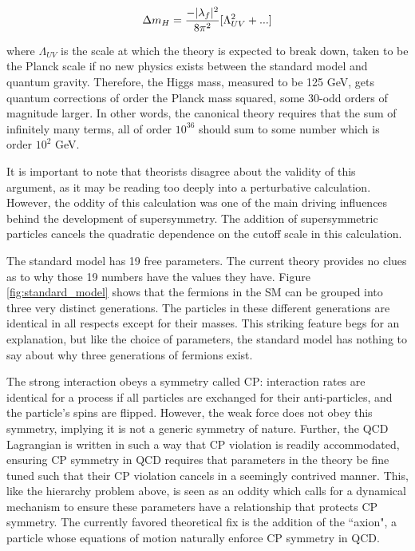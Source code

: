 \begin{enumerate}
      \[
        \Delta m_H = \frac{-\lvert \lambda_f \rvert^2}{8 \pi^2} [\Lambda_{UV}^2 + ...]
      \]

      where $\Lambda_{UV}$ is the scale at which the theory is expected to break down, taken to be the Planck scale if no new physics exists between the standard model and quantum gravity. Therefore, the Higgs mass, measured to be 125 GeV, gets quantum corrections of order the Planck mass squared, some 30-odd orders of magnitude larger. In other words, the canonical theory requires that the sum of infinitely many terms, all of order $10^{36}$ should sum to some number which is order $10^2$ GeV.

      It is important to note that theorists disagree about the validity of this argument, as it may be reading too deeply into a perturbative calculation. However, the oddity of this calculation was one of the main driving influences behind the development of supersymmetry. The addition of supersymmetric particles cancels the quadratic dependence on the cutoff scale in this calculation.

       The standard model has 19 free parameters. The current theory provides no clues as to why those 19 numbers have the values they have.
       Figure \ref{fig:standard_model} shows that the fermions in the SM can be grouped into three very distinct generations. The particles in these different generations are identical in all respects except for their masses. This striking feature begs for an explanation, but like the choice of parameters, the standard model has nothing to say about why three generations of fermions exist.
    
       The strong interaction obeys a symmetry called CP: interaction rates are identical for a process if all particles are exchanged for their anti-particles, and the particle's spins are flipped. However, the weak force does not obey this symmetry, implying it is not a generic symmetry of nature. Further, the QCD Lagrangian is written in such a way that CP violation is readily accommodated, ensuring CP symmetry in QCD requires that parameters in the theory be fine tuned such that their CP violation cancels in a seemingly contrived manner. This, like the hierarchy problem above, is seen as an oddity which calls for a dynamical mechanism to ensure these parameters have a relationship that protects CP symmetry. The currently favored theoretical fix is the addition of the ``axion", a particle whose equations of motion naturally enforce CP symmetry in QCD.~\cite{axion}



\end{enumerate}
